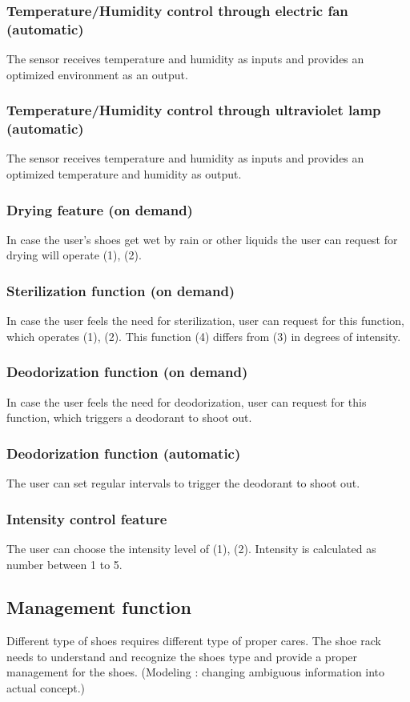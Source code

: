 \documentclass[conference]{IEEEtran}
\begin{document}
\subsubsection{Temperature/Humidity control through electric fan (automatic)}
The sensor receives temperature and humidity as inputs and provides an optimized environment as an output.
\subsubsection{Temperature/Humidity control through ultraviolet lamp (automatic)}
The sensor receives temperature and humidity as inputs and provides an optimized temperature and humidity as output.
\subsubsection{Drying feature (on demand)}
In case the user's shoes get wet by rain or other liquids the user can request for drying will operate (1), (2).
\subsubsection{Sterilization function (on demand)}
In case the user feels the need for sterilization, user can request for this function, which operates (1), (2).
This function (4) differs from (3) in degrees of intensity.
\subsubsection{Deodorization function (on demand)}
In case the user feels the need for deodorization, user can request for this function, which triggers a deodorant to shoot out.
\subsubsection{Deodorization function (automatic)}
The user can set regular intervals to trigger the deodorant to shoot out.
\subsubsection{Intensity control feature}
The user can choose the intensity level of (1), (2). Intensity is calculated as number between 1 to 5.


\subsection{Management function}
Different type of shoes requires different type of proper cares. The shoe rack needs to understand and recognize the shoes type and provide a proper management for the shoes.
(Modeling : changing ambiguous information into actual concept.)
\end{document}
